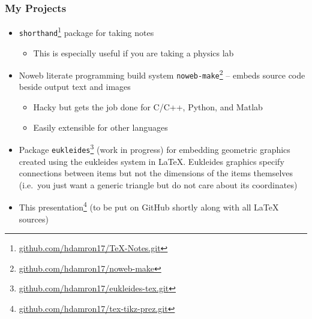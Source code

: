 \documentclass{beamer}
\let\oldLaTeX\LaTeX
\renewcommand{\LaTeX}{\oldLaTeX\xspace}
\begin{document}
	\begin{frame}
		\frametitle{My Projects}
		\begin{itemize}
			\item \texttt{shorthand}\footnote{\url{github.com/hdamron17/TeX-Notes.git}} package for taking notes
			\begin{itemize}
				\item This is especially useful if you are taking a physics lab
			\end{itemize}
			\item Noweb literate programming build system \texttt{noweb-make}\footnote{\url{github.com/hdamron17/noweb-make}} -- embeds source code beside output text and images
			\begin{itemize}
				\item Hacky but gets the job done for C/C++, Python, and Matlab
				\item Easily extensible for other languages
			\end{itemize}
			\item Package \texttt{eukleides}\footnote{\url{github.com/hdamron17/eukleides-tex.git}} (work in progress) for embedding geometric graphics created using the eukleides system in \LaTeX. Eukleides graphics specify connections between items but not the dimensions of the items themselves (i.e.\ you just want a generic triangle but do not care about its coordinates)
			\item This presentation\footnote{\url{github.com/hdamron17/tex-tikz-prez.git}} (to be put on GitHub shortly along with all \LaTeX sources)
		\end{itemize}
	\end{frame}
\end{document}
